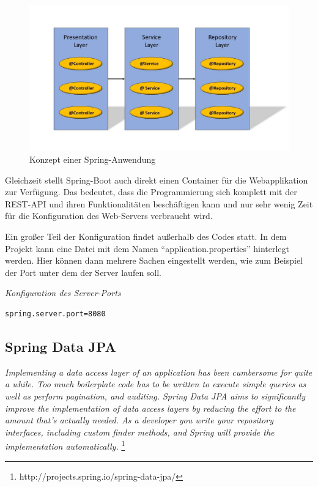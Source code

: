 \begin{figure}[htp]     %
\centering
\includegraphics[width=1\textwidth]{bilder/SpringLayers} 
\caption[Der Grafik \url{http://image.slidesharecdn.com/springsourceusi2009v3-0-090702135517-phpapp01/95/developing-modular-java-applications-13-728.jpg?cb=1246543977}]{Konzept einer Spring-Anwendung}
\end{figure} 

Gleichzeit stellt Spring-Boot auch direkt einen Container für die Webapplikation zur Verfügung. Das bedeutet, dass die Programmierung sich komplett mit der REST-API und ihren Funktionalitäten beschäftigen kann und nur sehr wenig Zeit für die Konfiguration des Web-Servers verbraucht wird.

Ein großer Teil der Konfiguration findet außerhalb des Codes statt. In dem Projekt kann eine Datei mit dem Namen ``application.properties'' hinterlegt werden. Hier können dann mehrere Sachen eingestellt werden, wie zum Beispiel der Port unter dem der Server laufen soll.

\begin{minipage}{\textwidth}
\emph{Konfiguration des Server-Ports}
\begin{lstlisting}
spring.server.port=8080
\end{lstlisting} 
\end{minipage}

\subsection{Spring Data JPA}

\emph{\glqq   
Implementing a data access layer of an application has been cumbersome for quite a while. Too much boilerplate code has to be written to execute simple queries as well as perform pagination, and auditing. Spring Data JPA aims to significantly improve the implementation of data access layers by reducing the effort to the amount that’s actually needed. As a developer you write your repository interfaces, including custom finder methods, and Spring will provide the implementation automatically.
\grqq} \footnote{http://projects.spring.io/spring-data-jpa/} \\

